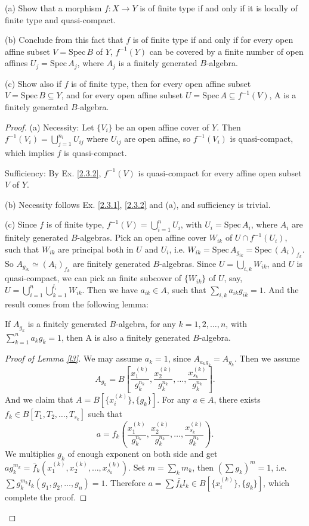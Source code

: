 \begin{exe}
	\label{2.3.3}
	(a) Show that a morphism $f:X\rightarrow Y$ is of finite type if and only if it is locally of finite type and quasi-compact.
	
	(b) Conclude from this fact that $f$ is of finite type if and only if for every open affine subset $V=\mathrm{Spec}\,B$ of $Y$, $f^{-1}(Y)$ can be covered
	by a finite number of open affines $U_j=\mathrm{Spec}\,A_j$, where $A_j$ is a finitely generated $B$-algebra.
	
	(c) Show also if $f$ is of finite type, then for every open affine subset $V=\mathrm{Spec}\,B\subseteq Y$, and for every open affine
	subset $U=\mathrm{Spec}\,A\subseteq f^{-1}(V)$, A is a finitely generated $B$-algebra.
\end{exe}
\begin{proof}
	(a) Necessity: Let $\{V_i\}$ be an open affine cover of $Y$. Then $f^{-1}(V_i)=\bigcup_{j=1}^{n_i}U_{ij}$ where $U_{ij}$ are open affine, so $f^{-1}(V_i)$ is quasi-compact, which implies $f$ is quasi-compact.
	
	Sufficiency: By Ex. \ref{2.3.2}, $f^{-1}(V)$ is quasi-compact for every affine open subset $V$ of $Y$.
	
	(b) Necessity follows Ex. \ref{2.3.1}, \ref{2.3.2} and (a), and sufficiency is trivial.
	
	(c) Since $f$ is of finite type, $f^{-1}(V)=\bigcup_{i=1}^nU_i$, with $U_i=\mathrm{Spec}\,A_i$, where $A_i$ are finitely generated $B$-algebras. Pick an open affine cover $W_{ik}$ of $U\cap f^{-1}(U_i)$, such that 
	$W_{ik}$ are principal both in $U$ and $U_i$, i.e. $W_{ik}=\mathrm{Spec}\,A_{g_{ik}}=\mathrm{Spec}\,(A_{i})_{f_{k}}$. So $A_{g_{ik}}\simeq (A_{i})_{f_k}$ are finitely generated $B$-algebras. Since $U=\bigcup_{i,k} W_{ik}$, and
	$U$ is quasi-compact, we can pick an finite subcover of $\{W_{ik}\}$ of $U$, say, $U=\bigcup_{i=1}^n\bigcup_{k=1}^{l_i}W_{ik}$. Then we have $a_{ik}\in A$, such that $\sum_{i,k} a_{ik}g_{ik}=1$.
	And the result comes from the following lemma:
	\begin{lm}
		\label{l3}
		If $A_{g_k}$ is a finitely generated $B$-algebra, for any $k=1,2,\dots,n$, with $\sum_{k=1}^n a_kg_k=1$, then A is also a finitely generated $B$-algebra.
	\end{lm}
	\begin{proof}[Proof of Lemma \ref*{l3}]
		We may assume $a_k=1$, since $A_{a_kg_k}=A_{g_k}$. Then we assume $$A_{g_k}=B\left[\frac{x_1^{(k)}}{g_k^{n_k}},\frac{x_2^{(k)}}{g_k^{n_k}},\dots,\frac{x_{s_k}^{(k)}}{g_k^{n_k}}\right].$$
		And we claim that $A=B[\{x_i^{(k)}\},\{g_k\}]$. For any $a\in A$, there exists $f_k\in B[T_1,T_2,\dots,T_{s_k}]$ such that $$a=f_k\left(\frac{x_1^{(k)}}{g_k^{n_k}},\frac{x_2^{(k)}}{g_k^{n_k}},\dots,\frac{x_{s_k}^{(k)}}{g_k^{n_k}}\right).$$
		We multiplies $g_k$ of enough exponent on both side and get $ag_k^{m_k}=\bar {f}_k(x_1^{(k)},x_2^{(k)},\dots,x_{s_k}^{(k)})$. Set $m=\sum_k m_k$, then $ (\sum g_k)^m=1$, i.e. $\sum g_k^{m_k}l_k(g_1,g_2,\dots,g_n)=1$.
		Therefore $a=\sum \bar{f_k}l_k\in B[\{x_i^{(k)}\},\{g_k\}]$, which complete the proof.
	\end{proof}
\end{proof}

